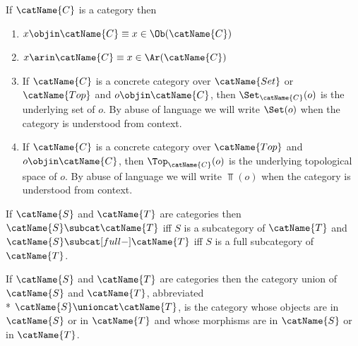 \documentclass{article}
\begin{document}
\begin{definition}
\label{def:catprop}
If $\catName{C}$ is a category then
\begin{enumerate}
\item
$x \objin \catName{C} \equiv x \in \Ob(\catName{C})$

\item
$x \arin \catName{C} \equiv x \in \Ar(\catName{C})$

\item
If $\catName{C}$ is a concrete category over $\catName{Set}$ or $\catName{Top}$
and $o \objin \catName{C}$, then $\Set_{\catName{C}}(o)$ is the underlying
set of $o$. By abuse of language we will write $\Set(o)$ when the
category is understood from context.

\item
If $\catName{C}$ is a concrete category over $\catName{Top}$ and
$o \objin \catName{C}$, then $\Top_{\catName{C}}(o)$ is the underlying
topological space of $o$. By abuse of language we will write $\Top(o)$
when the category is understood from context.
\end{enumerate}

If $\catName{S}$ and $\catName{T}$ are categories then
$\catName{S} \subcat \catName{T}$ iff $S$ is a subcategory of
$\catName{T}$ and $\catName{S} \subcat[full-] \catName{T}$ iff $S$ is a
full subcategory of $\catName{T}$.

If $\catName{S}$ and $\catName{T}$ are categories then the category
union of $\catName{S}$ and $\catName{T}$, abbreviated \\*
$\catName{S} \unioncat \catName{T}$, is the category whose objects are
in $\catName{S}$ or in $\catName{T}$ and whose morphisms are in
$\catName{S}$ or in $\catName{T}$.
\end{definition}
\end{document}
